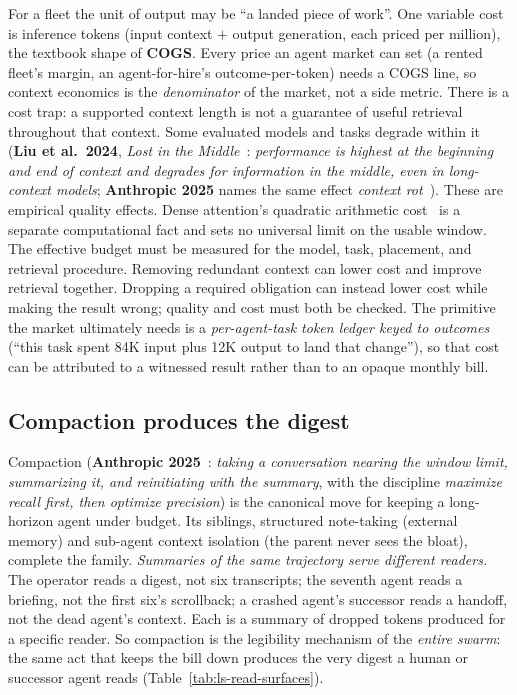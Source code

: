 \documentclass[11pt,a4paper]{article}
\theoremstyle{definition}
\theoremstyle{plain}
\begin{document}
For a fleet the unit of output may be ``a landed piece of work''. One
variable cost is inference tokens (input context $+$ output generation, each priced
per million), the textbook shape of \textbf{COGS}. Every price an agent market can
set (a rented fleet's margin, an agent-for-hire's outcome-per-token) needs a COGS
line, so context economics is the \emph{denominator} of the market, not a side metric.
There is a cost trap: a supported context length is not a guarantee of useful
retrieval throughout that context. Some evaluated models and tasks degrade within it (\textbf{Liu et al.\ 2024}, \emph{Lost in
the Middle}~: \emph{performance is highest at the beginning and end
of context and degrades for information in the middle, even in long-context models};
\textbf{Anthropic 2025} names the same effect \emph{context rot}~).
These are empirical quality effects. Dense attention's quadratic arithmetic
cost~ is a separate computational fact and sets no
universal limit on the usable window. The effective budget must
be measured for the model, task, placement, and retrieval procedure. Removing redundant context can lower cost and improve retrieval together.
Dropping a required obligation can instead lower cost while making the result
wrong; quality and cost must both be checked. The primitive the market ultimately needs is a \emph{per-agent-task token
ledger keyed to outcomes} (``this task spent 84K input plus 12K output to land
that change''), so that cost can be attributed to a witnessed result rather than to
an opaque monthly bill.

\subsection{Compaction produces the digest}\label{sec:tokens-digest}

Compaction (\textbf{Anthropic 2025}~: \emph{taking a
conversation nearing the window limit, summarizing it, and reinitiating with the
summary}, with the discipline \emph{maximize recall first, then optimize precision})
is the canonical move for keeping a long-horizon agent under budget. Its siblings,
structured note-taking (external memory) and sub-agent context isolation (the parent
never sees the bloat), complete the family. \emph{Summaries of the same trajectory serve different readers.} The
operator reads a digest, not six transcripts; the seventh agent reads a briefing, not
the first six's scrollback; a crashed agent's successor reads a handoff, not the dead
agent's context. Each is a summary of dropped tokens produced for a specific reader.
So compaction is the legibility mechanism of the \emph{entire swarm}: the same act
that keeps the bill down produces the very digest a human or successor agent reads
(Table~\ref{tab:ls-read-surfaces}).
\end{document}
